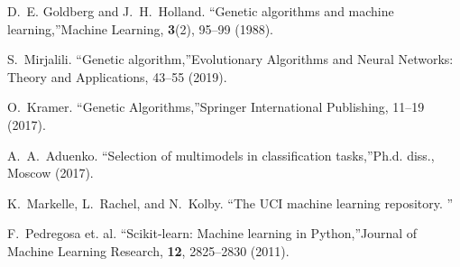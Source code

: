 \documentclass[
11pt,%
tightenlines,%
twoside,%
onecolumn,%
nofloats,%
nobibnotes,%
nofootinbib,%
superscriptaddress,%
noshowpacs,%
centertags]%
{revtex4-2}
\begin{document}
\begin{thebibliography}{99}
D.~E. Goldberg and J.~H.~Holland. \textquotedblleft Genetic algorithms and machine learning,\textquotedblright Machine Learning, \textbf{3}(2), 95--99 (1988).

S.~Mirjalili. \textquotedblleft Genetic algorithm,\textquotedblright Evolutionary Algorithms and Neural Networks: Theory and Applications, 43--55 (2019).

O.~Kramer. \textquotedblleft Genetic Algorithms,\textquotedblright Springer International Publishing, 11--19 (2017).

A.~A.~Aduenko. \textquotedblleft Selection of multimodels in classification tasks,\textquotedblright Ph.d. diss., Moscow (2017).

K.~Markelle, L.~Rachel, and N.~Kolby. \textquotedblleft The UCI machine learning repository. \textquotedblright

F.~Pedregosa et. al. \textquotedblleft Scikit-learn: Machine learning in Python,\textquotedblright Journal of Machine Learning Research, \textbf{12}, 2825--2830 (2011).

\end{thebibliography}
\end{document}
